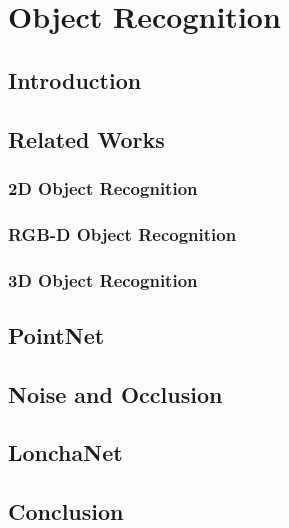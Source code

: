 \chapter{Object Recognition}
\label{cha:objrecog}

\section{Introduction}
\label{cha:objrecog:sec:introduction}

\section{Related Works}
\label{cha:objrecog:sec:relatedworks}

\subsection{2D Object Recognition}
\label{cha:objrecog:sec:relatedworks:subsec:2d}

\subsection{RGB-D Object Recognition}
\label{cha:objrecog:sec:relatedworks:subsec:rgbd}

\subsection{3D Object Recognition}
\label{cha:objrecog:sec:relatedworks:subsec:3d}

\section{PointNet}
\label{cha:objrecog:sec:pointnet}

\section{Noise and Occlusion}
\label{cha:objrecog:sec:noiseocclusion}

\section{LonchaNet}
\label{cha:objrecog:sec:lonchanet}

\section{Conclusion}
\label{cha:objrecog:sec:conclusion}
